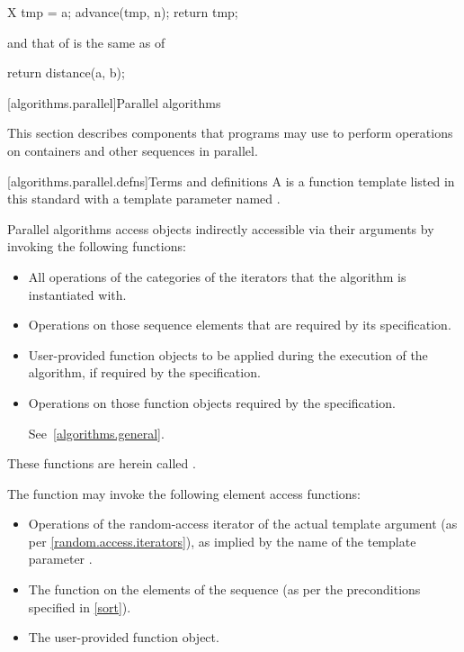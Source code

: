 \begin{codeblock}
X tmp = a;
advance(tmp, n);
return tmp;
\end{codeblock}

and that of
is the same as of

\begin{codeblock}
return distance(a, b);
\end{codeblock}

[algorithms.parallel]{Parallel algorithms}

This section describes components that \Cpp programs may use to perform
operations on containers and other sequences in parallel.

[algorithms.parallel.defns]{Terms and definitions}
\pnum
A  is a function template listed in this standard with
a template parameter named .

\pnum
Parallel algorithms access objects indirectly accessible via their arguments by
invoking the following functions:

\begin{itemize}
\item
All operations of the categories of the iterators that the algorithm is
instantiated with.

\item
Operations on those sequence elements that are required by its specification.

\item
User-provided function objects to be applied during the execution of the
algorithm, if required by the specification.

\item
Operations on those function objects required by the specification.
\begin{note} See~\ref{algorithms.general}.\end{note}
\end{itemize}

These functions are herein called .
\begin{example}
The  function may invoke the following element access functions:

\begin{itemize}
\item
Operations of the random-access iterator of the actual template argument
(as per \ref{random.access.iterators}),
as implied by the name of the template parameter .

\item
The  function on the elements of the sequence (as per the
preconditions specified in \ref{sort}).

\item
The user-provided  function object.
\end{itemize}
\end{example}

